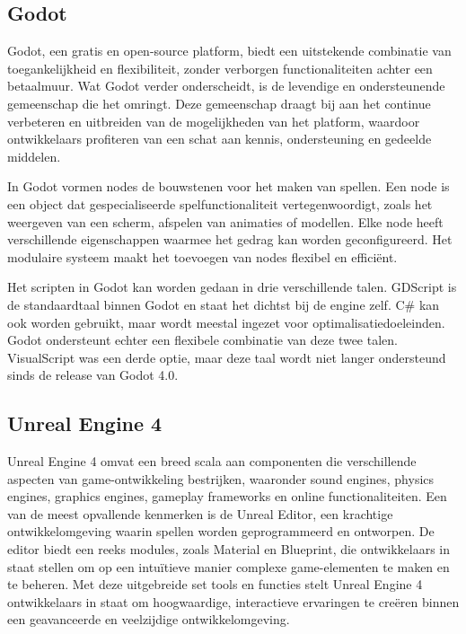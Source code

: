 \subsection{Godot}
Godot, een gratis en open-source platform, biedt een uitstekende combinatie van toegankelijkheid en flexibiliteit, zonder verborgen functionaliteiten achter een betaalmuur. Wat Godot verder onderscheidt, is de levendige en ondersteunende gemeenschap die het omringt. Deze gemeenschap draagt bij aan het continue verbeteren en uitbreiden van de mogelijkheden van het platform, waardoor ontwikkelaars profiteren van een schat aan kennis, ondersteuning en gedeelde middelen. \autocite{Bradfield2018}

In Godot vormen nodes de bouwstenen voor het maken van spellen. Een node is een object dat gespecialiseerde spelfunctionaliteit vertegenwoordigt, zoals het weergeven van een scherm, afspelen van animaties of modellen. Elke node heeft verschillende eigenschappen waarmee het gedrag kan worden geconfigureerd. Het modulaire systeem maakt het toevoegen van nodes flexibel en efficiënt. \autocite{Bradfield2018}

Het scripten in Godot kan worden gedaan in drie verschillende talen. GDScript is de standaardtaal binnen Godot en staat het dichtst bij de engine zelf. C# kan ook worden gebruikt, maar wordt meestal ingezet voor optimalisatiedoeleinden. Godot ondersteunt echter een flexibele combinatie van deze twee talen.\autocite{Bradfield2018} VisualScript was een derde optie, maar deze taal wordt niet langer ondersteund sinds de release van Godot 4.0.

\subsection{Unreal Engine 4}
Unreal Engine 4 omvat een breed scala aan componenten die verschillende aspecten van game-ontwikkeling bestrijken, waaronder sound engines, physics engines, graphics engines, gameplay frameworks en online functionaliteiten. Een van de meest opvallende kenmerken is de Unreal Editor, een krachtige ontwikkelomgeving waarin spellen worden geprogrammeerd en ontworpen. De editor biedt een reeks modules, zoals Material en Blueprint, die ontwikkelaars in staat stellen om op een intuïtieve manier complexe game-elementen te maken en te beheren. Met deze uitgebreide set tools en functies stelt Unreal Engine 4 ontwikkelaars in staat om hoogwaardige, interactieve ervaringen te creëren binnen een geavanceerde en veelzijdige ontwikkelomgeving. \autocite{lee2016learning}


